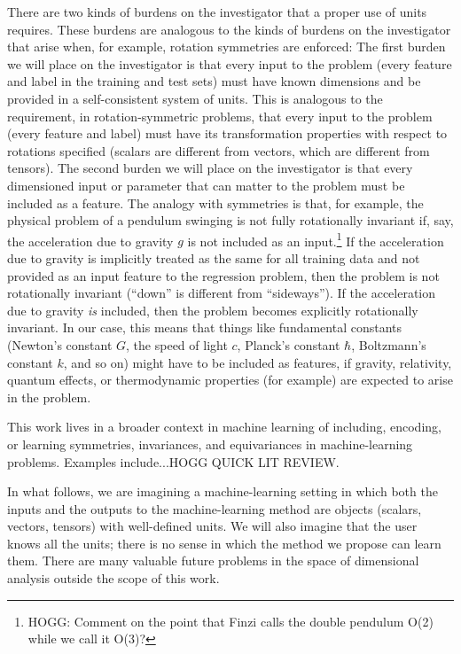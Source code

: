 \documentclass{article}
\begin{document}
There are two kinds of burdens on the investigator that a proper use of units requires.
These burdens are analogous to the kinds of burdens on the investigator that arise when, for example, rotation symmetries are enforced:
The first burden we will place on the investigator is that every input to the problem (every feature and label in the training and test sets) must have known dimensions and be provided in a self-consistent system of units.
This is analogous to the requirement, in rotation-symmetric problems, that every input to the problem (every feature and label) must have its transformation properties with respect to rotations specified (scalars are different from vectors, which are different from tensors).
The second burden we will place on the investigator is that every dimensioned input or parameter that can matter to the problem must be included as a feature.
The analogy with symmetries is that, for example, the physical problem of a pendulum swinging is not fully rotationally invariant if, say, the acceleration due to gravity $g$ is not included as an input.\footnote{HOGG: Comment on the point that Finzi \cite{finzi} calls the double pendulum O(2) while we \cite{yao} call it O(3)?}
If the acceleration due to gravity is implicitly treated as the same for all training data and not provided as an input feature to the regression problem, then the problem is not rotationally invariant (``down'' is different from ``sideways'').
If the acceleration due to gravity \emph{is} included, then the problem becomes explicitly rotationally invariant.
In our case, this means that things like fundamental constants (Newton's constant $G$, the speed of light $c$, Planck's constant $\hbar$, Boltzmann's constant $k$, and so on) might have to be included as features, if gravity, relativity, quantum effects, or thermodynamic properties (for example) are expected to arise in the problem.

This work lives in a broader context in machine learning of including, encoding, or learning symmetries, invariances, and equivariances in machine-learning problems.
Examples include...HOGG QUICK LIT REVIEW.

In what follows, we are imagining a machine-learning setting in which both the inputs and the outputs to the machine-learning method are objects (scalars, vectors, tensors) with well-defined units.
We will also imagine that the user knows all the units; there is no sense in which the method we propose can learn them.
There are many valuable future problems in the space of dimensional analysis outside the scope of this work.
\end{document}
